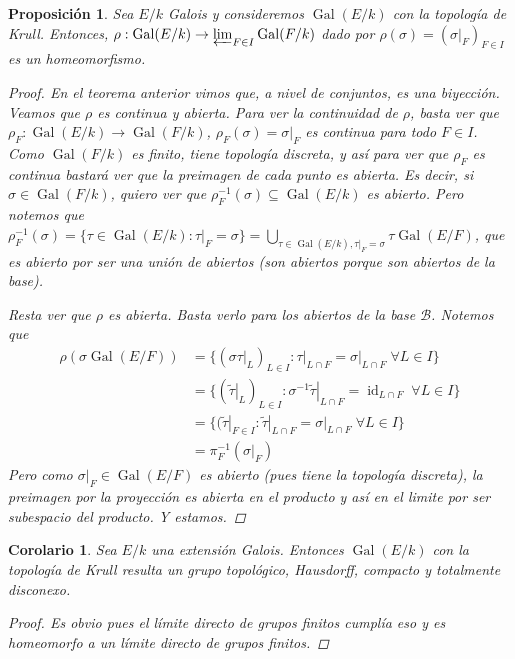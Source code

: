 \documentclass[12pt]{book}
\newtheorem{prop}[teo]{Proposición}
\newtheorem{cor}[teo]{Corolario}
\theoremstyle{definition}
\DeclareMathOperator{\id}{id}
\DeclareMathOperator{\Gal}{Gal}
\begin{document}
\begin{prop}
Sea $E/k$ Galois y consideremos $\Gal(E/k)$ con la topología de Krull. Entonces, $\rho:\Gal(E/k)\to \varprojlim_{F\in I}\Gal(F/k)$ dado por $\rho(\sigma) = (\left.\sigma\right|_{F})_{F\in I}$ es un homeomorfismo.
\begin{proof}
En el teorema anterior vimos que, a nivel de conjuntos, es una biyección. Veamos que $\rho$ es continua y abierta. Para ver la continuidad de $\rho$, basta ver que $\rho_F:\Gal(E/k)\to \Gal(F/k)$, $\rho_F(\sigma)=\left.\sigma\right|_F$ es continua para todo $F\in I$. Como $\Gal(F/k)$ es finito, tiene topología discreta, y así para ver que $\rho_F$ es continua bastará ver que la preimagen de cada punto es abierta. Es decir, si $\sigma\in\Gal(F/k)$, quiero ver que $\rho_F^{-1}(\sigma)\subseteq\Gal(E/k)$ es abierto. Pero notemos que $\rho_F^{-1}(\sigma) = \{\tau\in\Gal(E/k) : \left.\tau\right|_F = \sigma\} = \displaystyle\bigcup_{\tau\in\Gal(E/k), \left.\tau\right|_F=\sigma} \tau\Gal(E/F)$, que es abierto por ser una unión de abiertos (son abiertos porque son abiertos de la base).

Resta ver que $\rho$ es abierta. Basta verlo para los abiertos de la base $\mathscr{B}$. Notemos que \begin{align*}\rho(\sigma\Gal(E/F)) &= \{(\left.\sigma\tau\right|_L)_{L\in I} : \left.\tau\right|_{L\cap F} = \left.\sigma\right|_{L\cap F}\; \forall L\in I\} \\ &= \{(\left.\tilde{\tau}\right|_{L})_{L\in I} : \left.\sigma^{-1}\tilde{\tau}\right|_{L\cap F} = \id_{L\cap F} \;\forall L\in I\} \\ &= \{(\left.\tilde{\tau}\right|_{F\in I} : \left.\tilde{\tau}\right|_{L\cap F} = \left.\sigma\right|_{L\cap F} \;\forall L\in I\} \\ &= \pi_F^{-1}(\left.\sigma\right|_F)\end{align*} Pero como $\left.\sigma\right|_F \in\Gal(E/F)$ es abierto (pues tiene la topología discreta), la preimagen por la proyección es abierta en el producto y así en el limite por ser subespacio del producto. Y estamos.
\end{proof}
\end{prop}

\begin{cor}
Sea $E/k$ una extensión Galois. Entonces $\Gal(E/k)$ con la topología de Krull resulta un grupo topológico, Hausdorff, compacto y totalmente disconexo.
\begin{proof}
Es obvio pues el límite directo de grupos finitos cumplía eso y es homeomorfo a un límite directo de grupos finitos.
\end{proof}
\end{cor}
\end{document}
